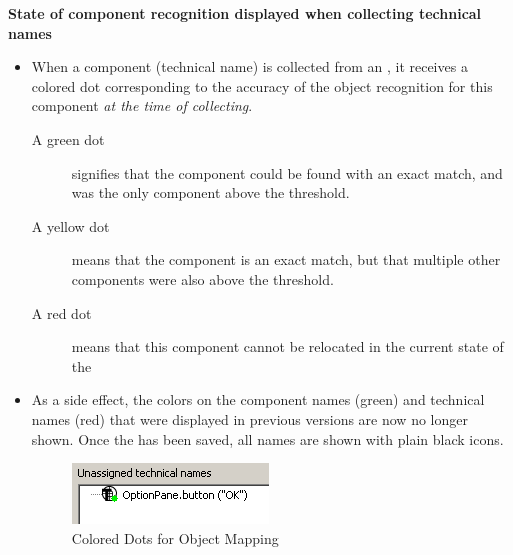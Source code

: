 \textbf{State of component recognition displayed when collecting technical names}
\begin{itemize}
\item When a component (technical name) is collected from an \gdaut{}, it receives a colored
dot corresponding to the accuracy of the object recognition for this component \textit{at the time of collecting}.
\begin{description}
\item [A green dot]{signifies that the component could be found with an exact match, and was the only component above the threshold}.
\item [A yellow dot]{means that the component is an exact match, but that multiple other components were also above the threshold.}
\item [A red dot]{ means that this component cannot be relocated in the current state of the \gdaut{}}
\end{description}
\item As a side effect, the colors on the component names (green) and technical names (red) that were displayed in previous versions are now no longer shown. Once the \gdomeditor{} has been saved, all names are shown with plain black icons. 
\begin{figure}[h]
\begin{center}
\includegraphics{52/ps/ColorDot}
\caption{Colored Dots for Object Mapping}
\label{RNColorDot}
\end{center}
\end{figure}
\end{itemize}

